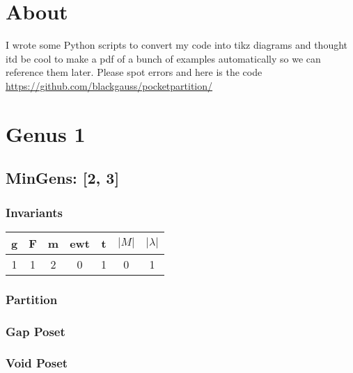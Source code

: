 \documentclass[a4paper]{article}
\begin{document}
\section{About}

I wrote some Python scripts to convert my code into tikz diagrams and thought itd be cool to make a pdf of a bunch of examples automatically so we can reference them later. Please spot errors and here is the code \url{https://github.com/blackgauss/pocketpartition/}
\tableofcontents
\newpage
\newpage
\section{Genus 1}
\newpage\subsection{MinGens: [2, 3]}
\noindent\begin{minipage}{0.6\textwidth}
\subsubsection*{Invariants}
\centering
\begin{tabular}{|c|c|c|c|c|c|c|}
\toprule
g & F & m & ewt & t & \(|M|\) & \(|\lambda|\) \\
\midrule
1 & 1 & 2 & 0 & 1 & 0 & 1 \\
\bottomrule
\end{tabular}
\end{minipage}%
\begin{minipage}{0.4\textwidth}
\subsubsection*{Partition}
\centering
{}
\end{minipage}
\vspace{1cm}
\noindent \newline\begin{minipage}{0.48\textwidth}
\subsubsection*{Gap Poset}
\centering
{}
\end{minipage}%
\hfill\begin{minipage}{0.48\textwidth}
\subsubsection*{Void Poset}
\centering
\end{minipage}
\newpage
\end{document}
